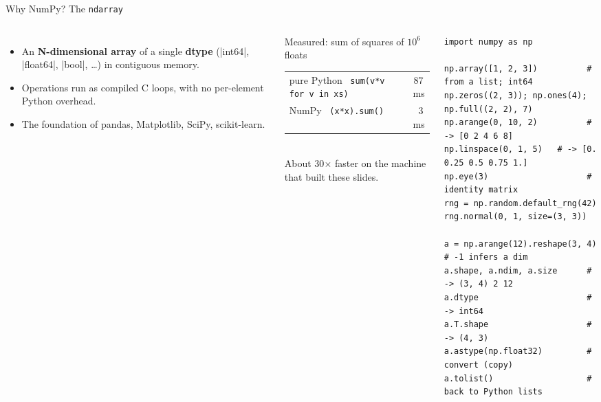 \documentclass[aspectratio=169,9pt]{beamer}
\newcommand{\cc}[1]{\texttt{#1}}                      %
\newcommand{\hint}[1]{{\small\color{ink2}#1}}  %
\begin{document}
\begin{frame}[fragile]{Why NumPy? The \texttt{ndarray}}
\begin{columns}[T]
\begin{itemize}\setlength\itemsep{4pt}
  \item An \textbf{N-dimensional array} of a single \textbf{dtype}
        (|int64|, |float64|, |bool|, \ldots) in contiguous memory.
  \item Operations run as compiled C loops, with no per-element
        Python overhead.
  \item The foundation of pandas, Matplotlib, SciPy, scikit-learn.
\end{itemize}
\begin{exampleblock}{Measured: sum of squares of $10^6$ floats}
\footnotesize
\begin{tabular}{@{}lr@{}}
pure Python \ \cc{sum(v*v for v in xs)} & 87\,ms \\
NumPy \ \cc{(x*x).sum()}               & 3\,ms \\
\end{tabular}\\[2pt]
\hint{About 30$\times$ faster on the machine that built these slides.}
\end{exampleblock}
\begin{lstlisting}
import numpy as np

np.array([1, 2, 3])          # from a list; int64
np.zeros((2, 3)); np.ones(4); np.full((2, 2), 7)
np.arange(0, 10, 2)          # -> [0 2 4 6 8]
np.linspace(0, 1, 5)   # -> [0. 0.25 0.5 0.75 1.]
np.eye(3)                    # identity matrix
rng = np.random.default_rng(42)
rng.normal(0, 1, size=(3, 3))

a = np.arange(12).reshape(3, 4)  # -1 infers a dim
a.shape, a.ndim, a.size      # -> (3, 4) 2 12
a.dtype                      # -> int64
a.T.shape                    # -> (4, 3)
a.astype(np.float32)         # convert (copy)
a.tolist()                   # back to Python lists
\end{lstlisting}
\end{columns}
\end{frame}
\end{document}
